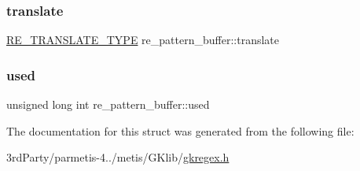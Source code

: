 \mbox{\label{structre__pattern__buffer_a780f81d1ec1ebba869e138b5bc849658}} 
\subsubsection{\texorpdfstring{translate}{translate}}
{\footnotesize\ttfamily \hyperlink{gkregex_8h_a96c9fb9c7074cb21740b63092b0637a4}{R\+E\+\_\+\+T\+R\+A\+N\+S\+L\+A\+T\+E\+\_\+\+T\+Y\+PE} re\+\_\+pattern\+\_\+buffer\+::translate}

\mbox{\label{structre__pattern__buffer_a5c6bb086f4bfebee8aa4373c03bcc74b}} 
\subsubsection{\texorpdfstring{used}{used}}
{\footnotesize\ttfamily unsigned long int re\+\_\+pattern\+\_\+buffer\+::used}



The documentation for this struct was generated from the following file\+:\begin{DoxyCompactItemize}
\item 
3rd\+Party/parmetis-\/4../metis/\+G\+Klib/\hyperlink{gkregex_8h}{gkregex.\+h}\end{DoxyCompactItemize}
